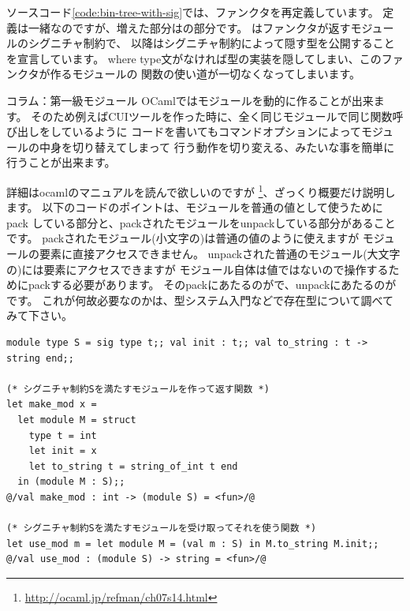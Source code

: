 \documentclass[11pt,a4paper]{jarticle}
\begin{document}
ソースコード\ref{code:bin-tree-with-sig}では、ファンクタを再定義しています。
定義は一緒なのですが、増えた部分はの部分です。
はファンクタが返すモジュールのシグニチャ制約で、
以降はシグニチャ制約によって隠す型を公開することを宣言しています。
where type文がなければ型の実装を隠してしまい、このファンクタが作るモジュールの
関数の使い道が一切なくなってしまいます。

\begin{itembox}[l]{コラム：第一級モジュール}
OCaml\cite{ocaml}ではモジュールを動的に作ることが出来ます。
そのため例えばCUIツールを作った時に、全く同じモジュールで同じ関数呼び出しをしているように
コードを書いてもコマンドオプションによってモジュールの中身を切り替えてしまって
行う動作を切り変える、みたいな事を簡単に行うことが出来ます。

詳細はocamlのマニュアルを読んで欲しいのですが
\footnote{\url{http://ocaml.jp/refman/ch07s14.html}}、ざっくり概要だけ説明します。
以下のコードのポイントは、モジュールを普通の値として使うためにpack
している部分と、packされたモジュールをunpackしている部分があることです。
packされたモジュール(小文字の)は普通の値のように使えますが
モジュールの要素に直接アクセスできません。
unpackされた普通のモジュール(大文字の)には要素にアクセスできますが
モジュール自体は値ではないので操作するためにpackする必要があります。
そのpackにあたるのがで、unpackにあたるのがです。
これが何故必要なのかは、型システム入門などで存在型について調べてみて下さい。

\begin{lstlisting}[caption=第一級モジュール モジュールを作る関数と使う関数]
module type S = sig type t;; val init : t;; val to_string : t -> string end;;

(* シグニチャ制約Sを満たすモジュールを作って返す関数 *)
let make_mod x =
  let module M = struct
    type t = int
    let init = x
    let to_string t = string_of_int t end
  in (module M : S);;
@/val make_mod : int -> (module S) = <fun>/@

(* シグニチャ制約Sを満たすモジュールを受け取ってそれを使う関数 *)
let use_mod m = let module M = (val m : S) in M.to_string M.init;;
@/val use_mod : (module S) -> string = <fun>/@
\end{lstlisting}
\end{itembox}
\end{document}
